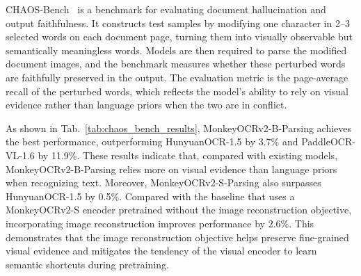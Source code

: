 \documentclass{article}
\begin{document}
CHAOS-Bench~\cite{hunyuanocr15} is a benchmark for evaluating document hallucination and output faithfulness. It constructs test samples by modifying one character in 2–3 selected words on each document page, turning them into visually observable but semantically meaningless words. Models are then required to parse the modified document images, and the benchmark measures whether these perturbed words are faithfully preserved in the output. The evaluation metric is the page-average recall of the perturbed words, which reflects the model's ability to rely on visual evidence rather than language priors when the two are in conflict.


As shown in Tab.~\ref{tab:chaos_bench_results}, MonkeyOCRv2-B-Parsing achieves the best performance, outperforming HunyuanOCR-1.5 by 3.7\% and PaddleOCR-VL-1.6 by 11.9\%. These results indicate that, compared with existing models, MonkeyOCRv2-B-Parsing relies more on visual evidence than language priors when recognizing text. Moreover, MonkeyOCRv2-S-Parsing also surpasses HunyuanOCR-1.5 by 0.5\%. Compared with the baseline that uses a MonkeyOCRv2-S encoder pretrained without the image reconstruction objective, incorporating image reconstruction improves performance by 2.6\%. This demonstrates that the image reconstruction objective helps preserve fine-grained visual evidence and mitigates the tendency of the visual encoder to learn semantic shortcuts during pretraining.
\end{document}
